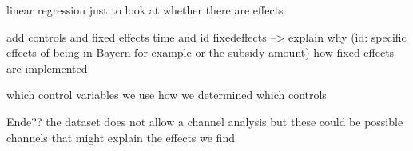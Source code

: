 \documentclass[12pt, a4paper]{article}\usepackage[]{graphicx}\usepackage[]{color}
\begin{document}
linear regression just to look at whether there are effects

add controls and fixed effects time and id fixedeffects --> explain why (id: specific effects of being in Bayern for example or the subsidy amount)
how fixed effects are implemented

which control variables we use
how we determined which controls





Ende??
the dataset does not allow a channel analysis but these could be possible channels that might explain the effects we find


\end{document}
